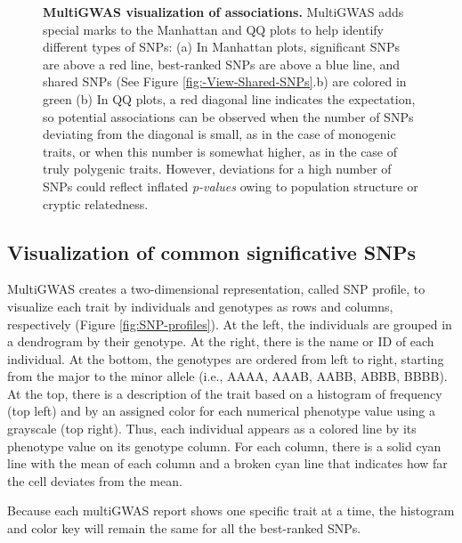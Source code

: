 \documentclass{article}
\begin{document}
\begin{figure}[H]
\caption{\scriptsize\textbf{MultiGWAS visualization of associations.} MultiGWAS adds special marks to the Manhattan and QQ plots to help identify different types of SNPs: (a) In Manhattan plots, significant SNPs are above a red line, best-ranked SNPs are above a blue line, and shared SNPs (See Figure \ref{fig:-View-Shared-SNPs}.b) are colored in green (b) In QQ plots, a red diagonal line indicates the expectation, so potential associations can be observed when the number of SNPs deviating from the diagonal is small, as in the case of monogenic traits, or when this number is somewhat higher, as in the case of truly polygenic traits. However, deviations for a high number of SNPs could reflect inflated \emph{p-values }owing to population structure or cryptic relatedness. \label{fig:view-qqmanhattan}}
\end{figure}

\subsection{Visualization of common significative SNPs }
MultiGWAS creates a two-dimensional representation, called SNP profile, to visualize each trait by individuals and genotypes as rows and columns, respectively (Figure \ref{fig:SNP-profiles}). At the left, the individuals are grouped in a dendrogram by their genotype. At the right, there is the name or ID of each individual. At the bottom, the genotypes are ordered from left to right, starting from the major to the minor allele (i.e., AAAA, AAAB, AABB, ABBB, BBBB). At the top, there is a description of the trait based on a histogram of frequency (top left) and by an assigned color for each numerical phenotype value using a grayscale (top right). Thus, each individual appears as a colored line by its phenotype value on its genotype column. For each column, there is a solid cyan line with the mean of each column and a broken cyan line that indicates how far the cell deviates from the mean.

Because each multiGWAS report shows one specific trait at a time, the histogram and color key will remain the same for all the best-ranked SNPs.
\end{document}
